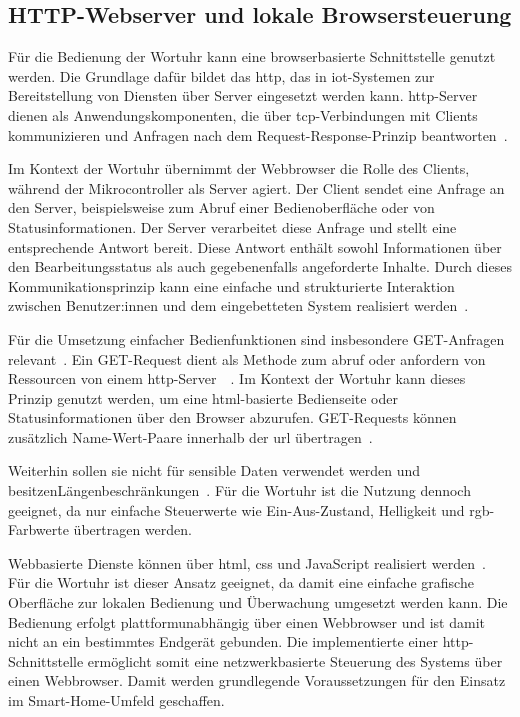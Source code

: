 \subsection{HTTP-Webserver und lokale Browsersteuerung}
Für die Bedienung der Wortuhr kann eine browserbasierte Schnittstelle genutzt werden.
Die Grundlage dafür bildet das \gls{http}, das in \gls{iot}-Systemen zur Bereitstellung von Diensten über Server eingesetzt werden kann.
\gls{http}-Server dienen als Anwendungskomponenten, die über \gls{tcp}-Verbindungen mit Clients kommunizieren und Anfragen nach dem Request-Response-Prinzip beantworten~\cite{hou2016iotcloud}.

Im Kontext der Wortuhr übernimmt der Webbrowser die Rolle des Clients, während der Mikrocontroller als Server agiert.
Der Client sendet eine Anfrage an den Server, beispielsweise zum Abruf einer Bedienoberfläche oder von Statusinformationen.
Der Server verarbeitet diese Anfrage und stellt eine entsprechende Antwort bereit.
Diese Antwort enthält sowohl Informationen über den Bearbeitungsstatus als auch gegebenenfalls angeforderte Inhalte.
Durch dieses Kommunikationsprinzip kann eine einfache und strukturierte Interaktion zwischen Benutzer:innen und dem eingebetteten System realisiert werden~\cite{W3Shttp}.

Für die Umsetzung einfacher Bedienfunktionen sind insbesondere GET-Anfragen relevant~\cite{hou2016iotcloud}.
Ein GET-Request dient als Methode zum abruf oder anfordern von Ressourcen von einem \gls{http}-Server~\cite{W3Shttp}~\cite{hou2016iotcloud}.
Im Kontext der Wortuhr kann dieses Prinzip genutzt werden, um eine \gls{html}-basierte Bedienseite oder Statusinformationen über den Browser abzurufen.
GET-Requests können zusätzlich Name-Wert-Paare innerhalb der \gls{url} übertragen~\cite{W3Shttp}.

Weiterhin sollen sie nicht für sensible Daten verwendet werden und besitzenLängenbeschränkungen~\cite{W3Shttp}.
Für die Wortuhr ist die Nutzung dennoch geeignet, da nur einfache Steuerwerte wie Ein-Aus-Zustand, Helligkeit und \gls{rgb}-Farbwerte übertragen werden.

Webbasierte Dienste können über \gls{html}, \gls{css} und JavaScript realisiert werden~\cite{hou2016iotcloud}.
Für die Wortuhr ist dieser Ansatz geeignet, da damit eine einfache grafische Oberfläche zur lokalen Bedienung und Überwachung umgesetzt werden kann.
Die Bedienung erfolgt plattformunabhängig über einen Webbrowser und ist damit nicht an ein bestimmtes Endgerät gebunden.
Die implementierte einer \gls{http}-Schnittstelle ermöglicht somit eine netzwerkbasierte Steuerung des Systems über einen Webbrowser.
Damit werden grundlegende Voraussetzungen für den Einsatz im Smart-Home-Umfeld geschaffen.

